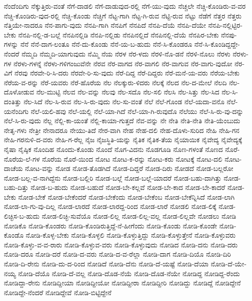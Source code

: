 {ನೆಂದೆಂದಿಗು
ನೆಕ್ಕುತ್ತಿರು-ವಂತೆ
ನೆಗೆ-ದಾಡಲಿ
ನೆಗೆ-ದಾಡುವುದ-ರಲ್ಲಿ
ನೆಗೆ-ಯು-ವುದು
ನೆಚ್ಚಲೇ
ನೆಚ್ಚಿ-ಕೊಂಡಿರು-ವ-ವರ
ನೆಚ್ಚಿ-ಕೊಂಡಿರು-ವುದ-ರಲ್ಲಿ
ನೆಚ್ಚಿ-ಕೊಂಡು
ನೆಚ್ಚಿಗೆ
ನೆಟ್ಟ-ಗಾಗಿ
ನೆಟ್ಟ-ಗಿ-ರುವ
ನೆಟ್ಟಿ-ರುವ
ನೆಟ್ಟು
ನೆಡೆಗೆ
ನೆತ್ತರ
ನೆತ್ತರು
ನೆತ್ತಿಯೇ-ನಾದರೂ
ನೆನ-ಪಾಗು-ವುದು
ನೆನಪಿ-ಗಾಗಿ
ನೆನಪಿಗೆ
ನೆನಪಿದೆ
ನೆನಪಿ-ದೆಯೆ
ನೆನಪಿ-ದೆಯೇ
ನೆನಪಿ-ನಲ್ಲಿಟ್ಟಿರ-ಬೇಕು
ನೆನಪಿ-ನಲ್ಲಿ-ಡ-ಬಲ್ಲೆ
ನೆನಪಿನಲ್ಲಿಡಿ
ನೆನಪಿ-ನಲ್ಲಿಡು
ನೆನಪಿನಲ್ಲಿದೆ
ನೆನಪಿನಲ್ಲಿ-ದೆಯೆ
ನೆನಪಿರ-ಬೇಕು
ನೆನಪು-ಗಳನ್ನು
ನೆನೆ
ನೆನೆ-ದಾಗ-ಲಂತೂ
ನೆನೆ-ದು-ಕೊಂಡು
ನೆನೆ-ಯ-ಬ-ಹುದು
ನೆನೆ-ಸಿ-ಕೊಂಡರೂ
ನೆನೆ-ಸಿ-ಕೊಂಡಿದ್ದದ್ದೇ-ನೆಂದರೆ
ನೆಮ್ಮದಿ
ನೆಮ್ಮದಿ-ಯಾಗುವುದು
ನೆಮ್ಮಿ
ನೆಯ
ನೆರಳ
ನೆರ-ಳದು
ನೆರಳಿ-ನೊ-ಡನೆ
ನೆರಳಿ-ನೊಲು
ನೆರಳು
ನೆರಳು-ಗಳ
ನೆರಳು-ಗಳನ್ನೆ
ನೆರಳು-ಗಳಿಗಂಜುವೆನೇ
ನೆರವ
ನೆರ-ವಾಗದ
ನೆರ-ವಾಗಲಿ
ನೆರ-ವಾಗುವ
ನೆರ-ವಾಗು-ವುದೋ
ನೆರ-ವಿಗೆ
ನೆರವು
ನೆರವೇ-ರಿ-ಸಿ-ದರು
ನೆರವೇ-ರಿ-ಸು-ವುದು
ನೆರೆ-ದಿದ್ದ
ನೆರೆ-ದಿದ್ದರು
ನೆರೆ-ಮನೆ-ಯ-ವರು
ನೆರೆಯ-ಬೇಕು
ನೆರೆಯ-ವ-ರನ್ನು
ನೆರೆ-ಯವರು
ನೆರೆ-ಹೊರೆಯ
ನೆಲ
ನೆಲಕ್ಕುರು-ಳಿದರು
ನೆಲಕ್ಕೆ
ನೆಲದ
ನೆಲ-ದ-ಮೇಲೆ
ನೆಲದಿ
ನೆಲ-ದೊಳೋಡುವ
ನೆಲ-ಮುಟ್ಟಿ
ನೆಲವ
ನೆಲ-ವನ್ನು
ನೆಲವು
ನೆಲ-ಸದೊ
ನೆಲ-ಸಲಿ
ನೆಲಸಿ
ನೆಲ-ಸಿತ್ತು
ನೆಲ-ಸಿದ
ನೆಲ-ಸಿ-ದಂತಿತ್ತು
ನೆಲ-ಸಿದೆ
ನೆಲ-ಸಿ-ರುವ
ನೆಲ-ಸಿ-ರು-ವುದು
ನೆಲ-ಸು-ವಂತೆ
ನೆಲೆ
ನೆಲೆ-ಗೊಂಡ
ನೆಲೆ-ಯದಾ-ವನೊ
ನೆಲೆ-ಯನೆಂದಿಗು
ನೆಲೆ-ಯಲಿ-ಹವು
ನೆಲೆ-ಯಲ್ಲಿ
ನೆಲೆ-ಯಾ-ಗಿದೆ
ನೆಲೆ-ಯಾ-ಗಿ-ರುವುದೊ
ನೆಲೆಯು
ನೆಲೆ-ಸಿ-ರು-ವು-ದನ್ನು
ನೆಲೆ-ಸಿ-ರು-ವುದು
ನೆಲ್ಲ
ನೆಲ್ಲಿ-ಕಾ-ಯಂತೆ
ನೆಲ್ಲಿ-ಕಾಯಾ-ಗುತ್ತದೆ
ನೆವ-ವನ್ನು
ನೇ
ನೇತಿ
ನೇತಿ-ನೇತಿ
ನೇತಿ-ಯೆಂಬುದು
ನೇತೃ-ಗಳು
ನೇತ್ರೀ
ನೇನಾದರೂ
ನೇಯು-ತಿದೆ
ನೇರ-ವಾಗಿ
ನೇಹ
ನೇಹ-ದಲಿ
ನೇಹ-ದೊಳು-ಸುರಿದ
ನೇಹಿ
ನೇಹಿ-ಗನ
ನೇಹಿ-ಗರನುಳಿ-ದ-ವರು
ನೇಹಿ-ಗ-ರೆಲ್ಲ
ನೈಜ
ನೈಜಸ್ಥಿತಿ-ಯನ್ನು
ನೈತಿಕ
ನೈತಿಕ-ತೆಯ
ನೈಯಾಯಿಕ
ನೈವೇದ್ಯ
ನೈವೇದ್ಯಕ್ಕೆ
ನೈಷಾ
ನೈಷ್ಠಿಕ
ನೊಂದಿಹ
ನೊಂದು-ಕೊಂಡು
ನೊಂದೆ
ನೊಗ-ವಿದನು
ನೊಡಗೂಡಿ
ನೊಣ-ಗಳಂತೆ
ನೊಣದ
ನೊರೆ-ನೊರೆಯ-ಲೆ-ಗಳ
ನೊರೆಯ
ನೊರೆ-ಯಿಂದ
ನೋಟ
ನೋಟ-ಕ-ರನ್ನು
ನೋಟ-ಕರು
ನೋಟಕ್ಕೆ
ನೋಟ-ದಲಿ
ನೋಟ-ದಾಚೆಯ
ನೋಟ-ವನ್ನು
ನೋಡ
ನೋಡ-ತೊಡಗಿದೆ
ನೋಡ-ದಿದ್ದರೆ
ನೋಡ-ದಿರು
ನೋಡದೆ
ನೋಡ-ಬಲ್ಲರೋ
ನೋಡ-ಬಲ್ಲ-ವ-ನಾಗಿದ್ದೆನು
ನೋಡ-ಬಲ್ಲಿರಿ
ನೋಡ-ಬಲ್ಲೆ
ನೋಡ-ಬಲ್ಲೆ-ಯಾದರೆ
ನೋಡ-ಬಹು-ದಾಗಿತ್ತು
ನೋಡ-ಬಹು-ದಿತ್ತು
ನೋಡ-ಬ-ಹುದು
ನೋಡ-ಬಹುದೆ
ನೋಡ-ಬೇ-ಕಲ್ಲವೆ
ನೋಡ-ಬೇ-ಕಾದ
ನೋಡ-ಬೇ-ಕಾದರೆ
ನೋಡ-ಬೇಕು
ನೋಡ-ಬೇಕೆ
ನೋಡ-ಬೇಕೆಂದರೆ
ನೋಡ-ಬೇಕೆಂದು
ನೋಡ-ಬೇಕೆಂಬ
ನೋಡ-ಬೇಕೆನ್ನಿಸಿದೆ
ನೋಡ-ಲಾಗಿ
ನೋಡ-ಲಾ-ಗು-ವು-ದಿಲ್ಲ
ನೋಡ-ಲಾರದೆ
ನೋಡ-ಲಾರದ್ದ-ರಿಂದ
ನೋಡ-ಲಾರೆ
ನೋಡಲಿ
ನೋಡ-ಲಿಕ್ಕೆ
ನೋಡ-ಲಿಚ್ಛಿಸ-ಬ-ಹುದು
ನೋಡ-ಲಿಚ್ಛಿ-ಸುವೆಯೊ
ನೋಡ-ಲಿಲ್ಲ
ನೋಡ-ಲಿಲ್ಲ-ವಲ್ಲ
ನೋಡ-ಲಿಲ್ಲವೇ
ನೋಡಲು
ನೋಡಿ
ನೋಡಿಕೊ
ನೋಡಿ-ಕೊಂಡರು
ನೋಡಿ-ಕೊಂಡಿರುತ್ತಿದ್ದೆ-ನೆ-ಹೀಗೆಂದು
ನೋಡಿ-ಕೊಂಡು
ನೋಡಿ-ಕೊಂಡೇ
ನೋಡಿ-ಕೊಂಡೊ
ನೋಡಿ-ಕೊಳ್ಳ-ಬೇಕು
ನೋಡಿ-ಕೊಳ್ಳಲಿ
ನೋಡಿ-ಕೊಳ್ಳುತ್ತಿದ್ದು
ನೋಡಿ-ಕೊಳ್ಳುತ್ತೇನೆ
ನೋಡಿ-ಕೊಳ್ಳುವರು
ನೋಡಿ-ಕೊಳ್ಳು-ವ-ವ-ರಾರು
ನೋಡಿ-ಕೊಳ್ಳುವ-ವರು
ನೋಡಿ-ಕೊಳ್ಳುವುದು
ನೋಡಿದ
ನೋಡಿ-ದನು
ನೋಡಿ-ದರು
ನೋಡಿ-ದರೂ
ನೋಡಿ-ದರೆ
ನೋಡಿ-ದ-ವರು
ನೋಡಿ-ದ-ವ-ರೆಲ್ಲಾ
ನೋಡಿ-ದಾಗ
ನೋಡಿ-ದಿಯೊ
ನೋಡಿ-ದಿರಿ
ನೋಡಿ-ದಿ-ರೇನು
ನೋಡಿ-ದು-ದ-ರಿಂದ
ನೋಡಿದೆ
ನೋಡಿ-ದೆನು
ನೋಡಿ-ದೆ-ಯಷ್ಟೆ
ನೋಡಿ-ದೆಯಾ
ನೋಡಿ-ದೆ-ಯೇ-ನಯ್ಯ
ನೋಡಿ-ದೆಯೊ
ನೋಡಿ-ದೆ-ವಲ್ಲ
ನೋಡಿ-ದೊಡ-ನೆಯೆ
ನೋಡಿ-ದೊಡ-ನೆಯೇ
ನೋಡಿದ್ದ
ನೋಡಿದ್ದ-ರೆಂದು
ನೋಡಿದ್ದಾ-ರೇನು
ನೋಡಿದ್ದೀಯಾ
ನೋಡಿದ್ದೀಯೋ
ನೋಡಿದ್ದೀರಾ
ನೋಡಿದ್ದೀರಿ
ನೋಡಿದ್ದು
ನೋಡಿದ್ದೆ
ನೋಡಿದ್ದೇನೆ
ನೋಡಿದ್ದೇ-ನೆಂದರೆ
ನೋಡಿದ್ದೇವೆ
ನೋಡಿ-ಬಿಟ್ಟಿದ್ದೇನೆ
}
